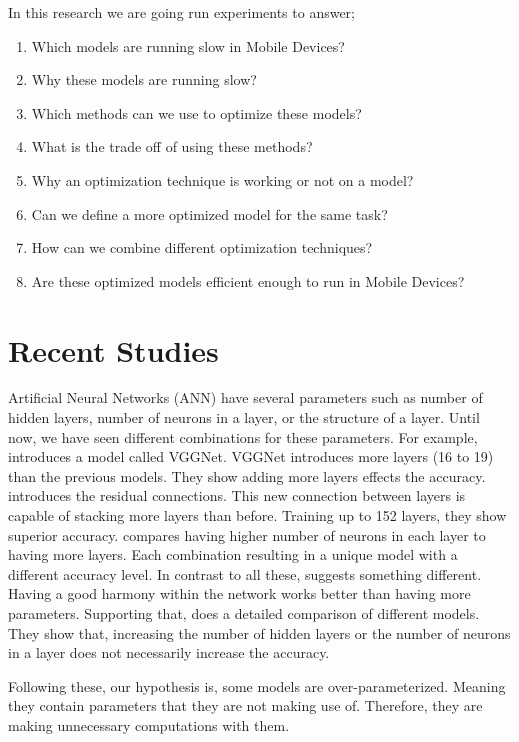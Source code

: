 In this research we are going run experiments to answer;
\begin{enumerate}
\item    Which models are running slow in Mobile Devices?
\item    Why these models are running slow?
\item    Which methods can we use to optimize these models?
\item    What is the trade off of using these methods?
\item    Why an optimization technique is working or not on a model?
\item    Can we define a more optimized model for the same task?
\item    How can we combine different optimization techniques?
\item    Are these optimized models efficient enough to run in Mobile Devices? 
\end{enumerate}

\section{Recent Studies}
Artificial Neural Networks (ANN) have several parameters such as number of hidden layers, number of neurons in a layer, or the structure of a layer. Until now, we have seen different combinations for these parameters. For example, \cite{Simonyan:2014aa} introduces a model called VGGNet. VGGNet introduces more layers (16 to 19) than the previous models. They show adding more layers effects the accuracy. \cite{He:2015aa} introduces the residual connections. This new connection between layers is capable of stacking more layers than before. Training up to 152 layers, they show superior accuracy. \cite{Zagoruyko:2016aa} compares having higher number of neurons in each layer to having more layers. Each combination resulting in a unique model with a different accuracy level. In contrast to all these, \cite{Szegedy:2014aa} suggests something different. Having a good harmony within the network works better than having more parameters. Supporting that, \cite{Canziani:2016aa} does a detailed comparison of different models. They show that, increasing the number of hidden layers or the number of neurons in a layer does not necessarily increase the accuracy. 

Following these, our hypothesis is, some models are over-parameterized. Meaning they contain parameters that they are not making use of. Therefore, they are making unnecessary computations with them.

